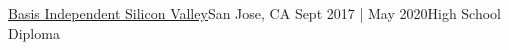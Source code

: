 \resumeSubheadingEdu
{\href{https://siliconvalley.basisindependent.com/}{Basis Independent Silicon Valley}}{San Jose, CA}
{Sept 2017 | May 2020}{High School Diploma}
